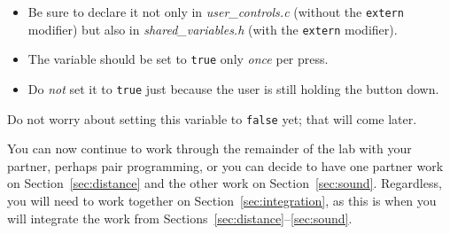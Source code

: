 \begin{description}
        \begin{itemize}
            \item Be sure to declare it not only in \textit{user\_controls.c} (without the \lstinline{extern} modifier) but also in \textit{shared\_variables.h} (with the \lstinline{extern} modifier).
        \end{itemize}
        \begin{itemize}
            \item The variable should be set to \lstinline{true} only \textit{once} per press.
            \item Do \textit{not} set it to \lstinline{true} just because the user is still holding the button down.
        \end{itemize}
\end{description}

Do not worry about setting this variable to \lstinline{false} yet;
that will come later.

\vspace{1cm}

You can now continue to work through the remainder of the lab with your partner, perhaps pair programming,
or you can decide to have one partner work on Section~\ref{sec:distance} and the other work on Section~\ref{sec:sound}.
Regardless, you will need to work together on Section~\ref{sec:integration}, as this is when you will integrate the work from Sections~\ref{sec:distance}--\ref{sec:sound}.
